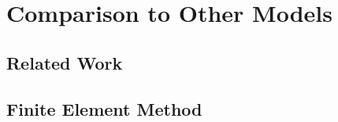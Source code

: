 
\chapter{Comparison to Other Models}
\label{ch:experiments}

\section{Related Work}

\section{Finite Element Method}